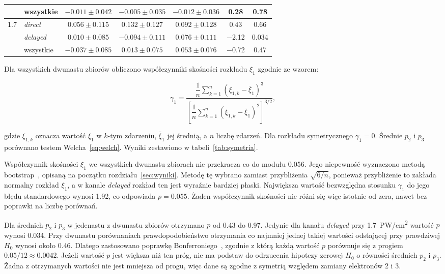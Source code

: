 \documentclass[12pt,a4paper]{article}
\newcommand{\PWcm}{PW/cm\textsuperscript{2}}
\begin{document}
\begin{table}[htbp]
\begin{tabular}{llccccc}
              & wszystkie      & $\num{-0.011}\pm\num{0.042}$ & $\num{-0.005}\pm\num{0.035}$ & $\num{-0.012}\pm\num{0.036}$ & \num{0.28} & \num{0.78} \\
    \midrule
    \num{1.7} & \emph{direct}  & $\num{0.056}\pm\num{0.115}$ & $\num{0.132}\pm\num{0.127}$ & $\num{0.092}\pm\num{0.128}$ & \num{0.43} & \num{0.66} \\
              & \emph{delayed} & $\num{0.010}\pm\num{0.085}$ & $\num{-0.094}\pm\num{0.111}$ & $\num{0.076}\pm\num{0.111}$ & \num{-2.12} & \num{0.034} \\
              & wszystkie      & $\num{-0.037}\pm\num{0.085}$ & $\num{0.013}\pm\num{0.075}$ & $\num{0.053}\pm\num{0.076}$ & \num{-0.72} & \num{0.47} \\
    \bottomrule
  \end{tabular}
\end{table}

Dla wszystkich
dwunastu zbiorów obliczono współczynniki skośności rozkładu $\xi_1$ zgodnie ze wzorem:

\begin{equation}
  \gamma_1=\frac{\dfrac{1}{n}\displaystyle\sum_{k=1}^{n}\left(\xi_{1,k}-\bar{\xi}_1\right)^{3}}
               {\left[\dfrac{1}{n}\displaystyle\sum_{k=1}^{n}\left(\xi_{1,k}-\bar{\xi}_1\right)^{2}\right]^{3/2}},
  \label{eq:skosnosc}
\end{equation}

gdzie $\xi_{1,k}$ oznacza wartość $\xi_1$ w $k$-tym zdarzeniu,
$\bar{\xi}_1$ jej średnią, a $n$ liczbę zdarzeń. Dla rozkładu
symetrycznego $\gamma_1=0$. Średnie $p_2$ i $p_3$ porównano testem
Welcha~\eqref{eq:welch}. Wyniki zestawiono w tabeli~\ref{tab:symetria}.

Współczynnik skośności $\xi_1$ we wszystkich dwunastu zbiorach nie
przekracza co do modułu \num{0.056}. Jego niepewność wyznaczono metodą
bootstrap~\cite{Efron1979}, opisaną na początku
rozdziału~\ref{sec:wyniki}. Metodę tę wybrano zamiast przybliżenia
$\sqrt{6/n}$, ponieważ przybliżenie to zakłada normalny rozkład $\xi_1$,
a w kanale \emph{delayed} rozkład ten jest wyraźnie bardziej płaski.
Największa wartość bezwzględna stosunku $\gamma_1$ do jego błędu
standardowego wynosi \num{1.92}, co odpowiada
$p=\num{0.055}$. Żaden współczynnik skośności nie różni
się więc istotnie od zera, nawet bez poprawki na liczbę porównań.

Dla średnich $p_2$ i $p_3$ w jedenastu z dwunastu zbiorów otrzymano $p$ od \num{0.43} do
\num{0.97}. Jedynie dla kanału \emph{delayed} przy \num{1.7}~\PWcm{}
wartość $p$ wynosi \num{0.034}. Przy dwunastu porównaniach prawdopodobieństwo
otrzymania co najmniej jednej takiej wartości odstającej przy prawdziwej $H_0$
wynosi około \num{0.46}. Dlatego zastosowano poprawkę Bonferroniego~\cite{Dunn1961}, zgodnie
z którą każdą wartość $p$ porównuje się z progiem
$\num{0.05}/12\approx\num{0.0042}$. Jeżeli wartość $p$ jest większa niż ten
próg, nie ma podstaw do odrzucenia hipotezy zerowej $H_0$ o równości
średnich $p_2$ i $p_3$. Żadna z otrzymanych wartości nie jest mniejsza od progu, więc dane są zgodne z symetrią względem zamiany elektronów 2 i 3.
\end{document}
